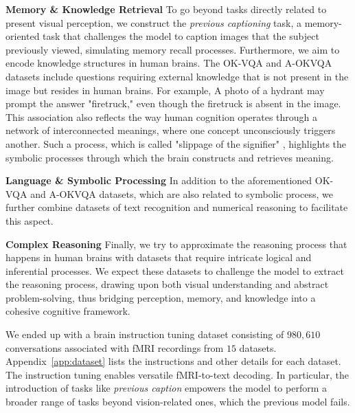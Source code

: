 \noindent\textbf{Memory \& Knowledge Retrieval} To go beyond tasks directly related to present visual perception, we construct the \emph{previous captioning} task, a memory-oriented task that challenges the model to caption images that the subject previously viewed, simulating memory recall processes. Furthermore, we aim to encode knowledge structures in human brains. The OK-VQA \cite{marino2019ok} and A-OKVQA \cite{schwenk2022okvqa} datasets include questions requiring external knowledge that is not present in the image but resides in human brains. For example, A photo of a hydrant may prompt the answer "firetruck," even though the firetruck is absent in the image. This association also reflects the way human cognition operates through a network of interconnected meanings, where one concept unconsciously triggers another. Such a process, which is called "slippage of the signifier" \cite{lacan2001ecrits, lacan1988seminar, miller2018four}, highlights the symbolic processes through which the brain constructs and retrieves meaning. 

\noindent\textbf{Language \& Symbolic Processing} In addition to the aforementioned OK-VQA and A-OKVQA datasets, which are also related to symbolic process, we further combine datasets of text recognition \cite{biten2019scene} and numerical reasoning \cite{acharya2019tallyqa} to facilitate this aspect.

\noindent\textbf{Complex Reasoning} Finally, we try to approximate the reasoning process that happens in human brains with datasets \cite{liu2023visual,wang2023see,li2018vqa} that require intricate logical and inferential processes. We expect these datasets to challenge the model to extract the reasoning process, drawing upon both visual understanding and abstract problem-solving, thus bridging perception, memory, and knowledge into a cohesive cognitive framework.

We ended up with a brain instruction tuning dataset consisting of $980,610$ conversations associated with fMRI recordings from $15$ datasets. Appendix~\ref{app:dataset} lists the instructions and other details for each dataset. The instruction tuning enables versatile fMRI-to-text decoding. In particular, the introduction of tasks like \textit{previous caption} empowers the model to perform a broader range of tasks beyond vision-related ones, which the previous model \cite{xia2024umbrae} fails.

